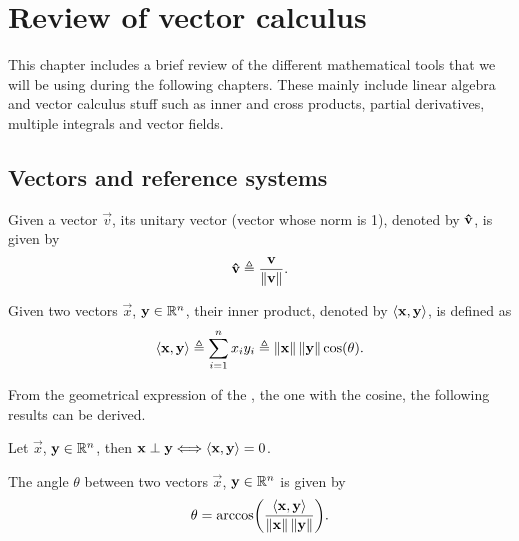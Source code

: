 \chapter{Review of vector calculus}
\thispagestyle{noheaders}

This chapter includes a brief review of the different mathematical tools that we will be using during the 
following chapters. These mainly include linear algebra and vector calculus stuff such as inner and cross
products, partial derivatives, multiple integrals and vector fields.

\section{Vectors and reference systems}

\begin{defn}
    Given a vector $\vec{v}$, its unitary vector (vector whose norm is 1), denoted by $\mathbf{\hat{v}}$, is given by
    \begin{equation}
        \mathbf{\hat{v}}\triangleq\frac{\mathbf{v}}{\left\Vert \mathbf{v} \right\Vert}.
    \end{equation}
\end{defn}

\begin{defn}\label{def:inner-product}
    Given two vectors $\vec{x}$, $\vec{y}\in\Rtn$, their inner product, denoted by $\langle \mathbf{x}, \mathbf{y} \rangle$, is
    defined as
    \begin{equation}
        \langle \mathbf{x}, \mathbf{y} \rangle\triangleq\sum_{i=1}^n x_iy_i \triangleq \left\Vert \mathbf{x} \right\Vert\left\Vert \mathbf{y} \right\Vert\cos(\theta).
    \end{equation}
\end{defn}

From the geometrical expression of the , the one with the cosine, the following results can
be derived.

\begin{prop}[Orthogonality]
    Let $\vec{x}$, $\vec{y}\in\Rtn$, then $\mathbf{x}\perp\mathbf{y}\Longleftrightarrow\langle \mathbf{x}, \mathbf{y} \rangle = 0$.
\end{prop}

\begin{prop}
    The angle $\theta$ between two vectors $\vec{x}$, $\vec{y}\in\Rtn$ is given by
    \begin{equation}
        \theta = \arccos(\frac{\langle \mathbf{x}, \mathbf{y} \rangle}{\left\Vert \mathbf{x} \right\Vert\left\Vert \mathbf{y} \right\Vert}).
    \end{equation}
\end{prop}

